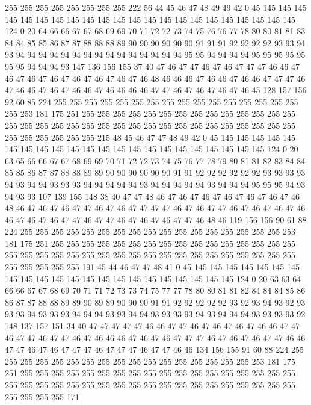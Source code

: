 255 255 255 255 255 255 255 255 222 56 44 45 46 47 48 49 49 42 0 45
145 145 145 145 145 145 145 145 145 145 145 145 145 145 145 145 145 145 145 145
145 145 124 0 20 64 66 66 67 67 68 69 69 70 71 72 72 73 74 75
76 76 77 78 80 80 81 81 83 84 84 85 85 86 87 87 88 88 88 89
90 90 90 90 90 90 91 91 91 92 92 92 92 93 93 94 93 94 94 94
94 94 94 94 94 94 94 94 94 94 94 94 95 95 94 94 94 94 95 95
95 95 95 95 95 94 94 94 93 147 136 156 155 37 40 47 46 47 47 46
47 46 47 47 47 46 46 47 46 47 46 47 46 47 46 47 46 47 46 47
46 48 46 46 46 47 46 46 47 46 46 47 47 47 46 47 46 46 47 46
47 46 46 47 46 46 46 46 47 47 46 47 46 47 46 47 46 45 128 157
156 92 60 85 224 255 255 255 255 255 255 255 255 255 255 255 255 255 255 255
255 255 253 181 175 251 255 255 255 255 255 255 255 255 255 255 255 255 255 255
255 255 255 255 255 255 255 255 255 255 255 255 255 255 255 255 255 255 255 255
255 255 255 255 255 215 48 45 46 47 47 48 49 42 0 45 145 145 145 145
145 145 145 145 145 145 145 145 145 145 145 145 145 145 145 145 145 145 124 0
20 63 65 66 66 67 67 68 69 69 70 71 72 72 73 74 75 76 77 78
79 80 81 81 82 83 84 84 85 85 86 87 87 88 88 89 89 90 90 90
90 90 90 91 91 92 92 92 92 92 92 93 93 93 93 94 93 94 94 93
93 93 94 94 94 94 94 93 94 94 94 94 94 93 94 94 94 95 95 95
94 93 94 93 93 107 139 155 148 38 40 47 47 48 46 47 46 47 46 47
46 47 46 47 46 47 46 48 46 47 46 47 46 47 47 46 47 46 47 47
47 47 46 47 46 47 47 46 47 46 47 46 47 46 46 47 46 47 46 47
47 46 47 47 46 47 46 47 46 47 47 46 48 46 119 156 156 90 61 88
224 255 255 255 255 255 255 255 255 255 255 255 255 255 255 255 255 255 253 181
175 251 255 255 255 255 255 255 255 255 255 255 255 255 255 255 255 255 255 255
255 255 255 255 255 255 255 255 255 255 255 255 255 255 255 255 255 255 255 255
255 255 191 45 44 46 47 47 48 41 0 45 145 145 145 145 145 145 145 145
145 145 145 145 145 145 145 145 145 145 145 145 145 145 124 0 20 63 63 64
66 66 67 67 68 69 70 71 71 72 73 73 74 75 77 77 78 80 80 81
81 82 84 84 84 85 86 86 87 87 88 88 89 89 90 89 89 90 90 90
91 91 92 92 92 92 92 93 92 93 94 93 92 93 93 93 94 93 93 93
94 94 94 93 93 94 94 93 93 93 93 94 93 94 94 94 93 93 93 93
92 148 137 157 151 34 40 47 47 47 47 47 46 46 47 47 46 47 46 47
46 47 46 46 47 47 46 47 47 46 47 47 46 47 46 46 46 47 46 47
46 47 47 47 46 47 46 47 46 47 47 46 46 47 47 46 47 46 47 47
47 46 47 47 47 46 47 47 46 46 134 156 155 91 60 88 224 255 255 255
255 255 255 255 255 255 255 255 255 255 255 255 255 255 253 181 175 251 255 255
255 255 255 255 255 255 255 255 255 255 255 255 255 255 255 255 255 255 255 255
255 255 255 255 255 255 255 255 255 255 255 255 255 255 255 255 255 255 255 171
